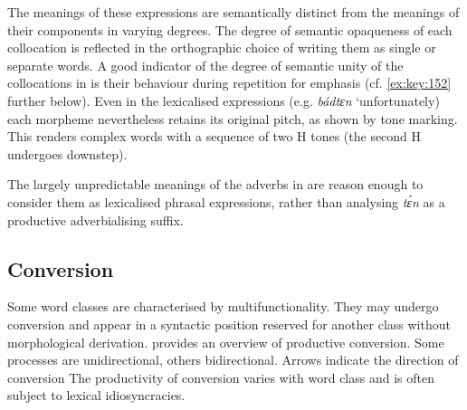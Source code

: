 The meanings of these expressions are semantically distinct from the meanings of their components in varying degrees. The degree of semantic opaqueness of each collocation is reflected in the orthographic choice of writing them as single or separate words. A good indicator of the  degree of semantic unity of the collocations in  is their behaviour during repetition for emphasis (cf. \ref{ex:key:152} further below). Even in the lexicalised expressions (e.g. \textit{bádtɛn} ‘unfortunately) each morpheme nevertheless retains its original pitch, as shown by tone marking. This renders complex words with a sequence of two H tones (the second H undergoes downstep).

The largely unpredictable meanings of the adverbs in  are reason enough to consider them as lexicalised phrasal expressions, rather than analysing \textit{tɛ́n} as a productive adverbialising suffix. 

\subsection{Conversion}

Some word classes are characterised by multifunctionality. They may undergo conversion and appear in a syntactic position reserved for another class without morphological derivation.  provides an overview of productive conversion. Some processes are unidirectional, others bidirectional. Arrows indicate the direction of conversion The productivity of conversion varies with word class and is often subject to lexical idiosyncracies. 

